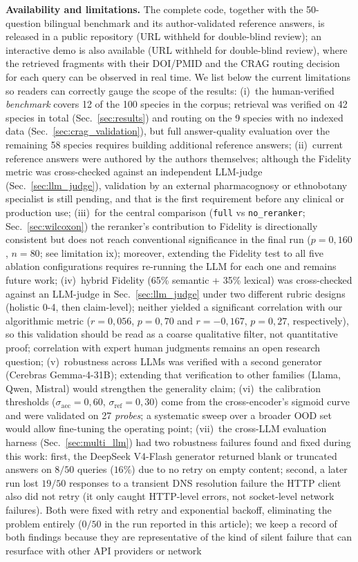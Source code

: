 \documentclass[runningheads]{llncs}
\begin{document}
\textbf{Availability and limitations.} The complete code, together with the 50-question bilingual benchmark and its author-validated reference answers, is released in a public repository (URL withheld for double-blind review); an interactive demo is also available (URL withheld for double-blind review), where the retrieved fragments with their DOI/PMID and the CRAG routing decision for each query can be observed in real time. We list below the current limitations so readers can correctly gauge the scope of the results: (i)~the human-verified \emph{benchmark} covers 12 of the 100 species in the corpus; retrieval was verified on 42 species in total (Sec.~\ref{sec:results}) and routing on the 9 species with no indexed data (Sec.~\ref{sec:crag_validation}), but full answer-quality evaluation over the remaining 58 species requires building additional reference answers; (ii)~current reference answers were authored by the authors themselves; although the Fidelity metric was cross-checked against an independent LLM-judge (Sec.~\ref{sec:llm_judge}), validation by an external pharmacognosy or ethnobotany specialist is still pending, and that is the first requirement before any clinical or production use; (iii)~for the central comparison (\texttt{full} vs \texttt{no\_reranker}; Sec.~\ref{sec:wilcoxon}) the reranker's contribution to Fidelity is directionally consistent but does not reach conventional significance in the final run ($p{=}0{,}160$, $n{=}80$; see limitation ix); moreover, extending the Fidelity test to all five ablation configurations requires re-running the LLM for each one and remains future work; (iv)~hybrid Fidelity (65\% semantic + 35\% lexical) was cross-checked against an LLM-judge in Sec.~\ref{sec:llm_judge} under two different rubric designs (holistic 0-4, then claim-level); neither yielded a significant correlation with our algorithmic metric ($r{=}0{,}056$, $p{=}0{,}70$ and $r{=}{-}0{,}167$, $p{=}0{,}27$, respectively), so this validation should be read as a coarse qualitative filter, not quantitative proof; correlation with expert human judgments remains an open research question; (v)~robustness across LLMs was verified with a second generator (Cerebras Gemma-4-31B); extending that verification to other families (Llama, Qwen, Mistral) would strengthen the generality claim; (vi)~the calibration thresholds ($\sigma_{\mathrm{acc}}{=}0{,}60$, $\sigma_{\mathrm{ref}}{=}0{,}30$) come from the cross-encoder's sigmoid curve and were validated on 27 \emph{probes}; a systematic sweep over a broader OOD set would allow fine-tuning the operating point; (vii)~the cross-LLM evaluation harness (Sec.~\ref{sec:multi_llm}) had two robustness failures found and fixed during this work: first, the DeepSeek V4-Flash generator returned blank or truncated answers on $8/50$ queries ($16\%$) due to no retry on empty content; second, a later run lost $19/50$ responses to a transient DNS resolution failure the HTTP client also did not retry (it only caught HTTP-level errors, not socket-level network failures). Both were fixed with retry and exponential backoff, eliminating the problem entirely ($0/50$ in the run reported in this article); we keep a record of both findings because they are representative of the kind of silent failure that can resurface with other API providers or network 
\end{document}
